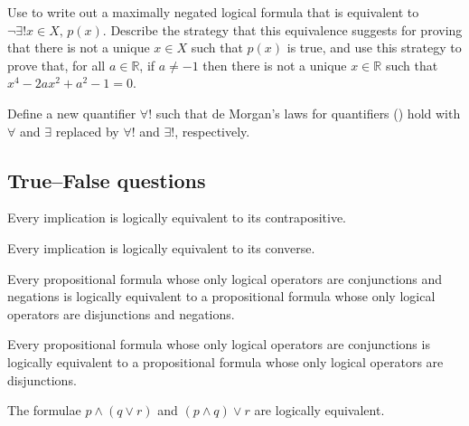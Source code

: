 \begin{chapex}
Use  to write out a maximally negated logical formula that is equivalent to $\neg \exists! x \in X,\, p(x)$. Describe the strategy that this equivalence suggests for proving that there is not a unique $x \in X$ such that $p(x)$ is true, and use this strategy to prove that, for all $a \in \mathbb{R}$, if $a \ne -1$ then there is not a unique $x \in \mathbb{R}$ such that $x^4-2ax^2+a^2-1=0$.
\end{chapex}

\begin{chapex}
Define a new quantifier $\forall !$ such that de Morgan's laws for quantifiers () hold with $\forall$ and $\exists$ replaced by $\forall !$ and $\exists !$, respectively.
\end{chapex}

\subsection*{True--False questions}


\begin{chapex} %
\label{cqLogicTFBegin}
Every implication is logically equivalent to its contrapositive.
\end{chapex}

\begin{chapex} %
Every implication is logically equivalent to its converse.
\end{chapex}

\begin{chapex} %
Every propositional formula whose only logical operators are conjunctions and negations is logically equivalent to a propositional formula whose only logical operators are disjunctions and negations.
\end{chapex}

\begin{chapex} %
Every propositional formula whose only logical operators are conjunctions is logically equivalent to a propositional formula whose only logical operators are disjunctions.
\end{chapex}

\begin{chapex} %
The formulae $p \wedge (q \vee r)$ and $(p \wedge q) \vee r$ are logically equivalent.
\end{chapex}

